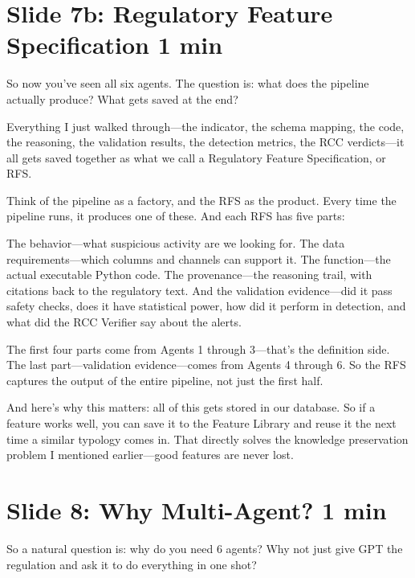 \documentclass[11pt, a4paper]{article}
\newcommand{\timing}[1]{{\hfill\small\color{gray}#1}}
\begin{document}
\section{Slide 7b: Regulatory Feature Specification \timing{1 min}}

So now you've seen all six agents. The question is: what does the pipeline actually produce? What gets saved at the end?

Everything I just walked through---the indicator, the schema mapping, the code, the reasoning, the validation results, the detection metrics, the RCC verdicts---it all gets saved together as what we call a Regulatory Feature Specification, or RFS.

Think of the pipeline as a factory, and the RFS as the product. Every time the pipeline runs, it produces one of these. And each RFS has five parts:

The behavior---what suspicious activity are we looking for. The data requirements---which columns and channels can support it. The function---the actual executable Python code. The provenance---the reasoning trail, with citations back to the regulatory text. And the validation evidence---did it pass safety checks, does it have statistical power, how did it perform in detection, and what did the RCC Verifier say about the alerts.

The first four parts come from Agents 1 through 3---that's the definition side. The last part---validation evidence---comes from Agents 4 through 6. So the RFS captures the output of the entire pipeline, not just the first half.

And here's why this matters: all of this gets stored in our database. So if a feature works well, you can save it to the Feature Library and reuse it the next time a similar typology comes in. That directly solves the knowledge preservation problem I mentioned earlier---good features are never lost.

\section{Slide 8: Why Multi-Agent? \timing{1 min}}

So a natural question is: why do you need 6 agents? Why not just give GPT the regulation and ask it to do everything in one shot?
\end{document}
